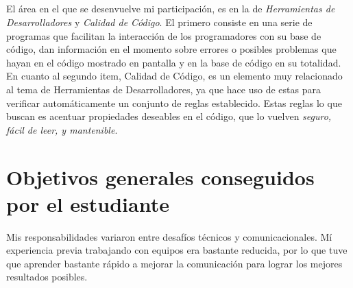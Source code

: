\documentclass[12pt]{extreport} %
\begin{document}
\paragraph{}
El área en el que se desenvuelve mi participación, es en la de
\emph{Herramientas de Desarrolladores} y \emph{Calidad de Código}. El
primero consiste en una serie de programas que facilitan la
interacción de los programadores con su base de código, dan
información en el momento sobre errores o posibles problemas que hayan
en el código mostrado en pantalla y en la base de código en su
totalidad. En cuanto al segundo item, Calidad de Código, es un
elemento muy relacionado al tema de Herramientas de Desarrolladores,
ya que hace uso de estas para verificar automáticamente un conjunto de
reglas establecido. Estas reglas lo que buscan es acentuar propiedades
deseables en el código, que lo vuelven \emph{seguro, fácil de leer, y
mantenible}.


\chapter{Objetivos generales conseguidos por el estudiante}

Mis responsabilidades variaron entre desafíos técnicos y
comunicacionales. Mí experiencia previa trabajando con equipos era
bastante reducida, por lo que tuve que aprender bastante rápido a
mejorar la comunicación para lograr los mejores resultados posibles.
\end{document}
